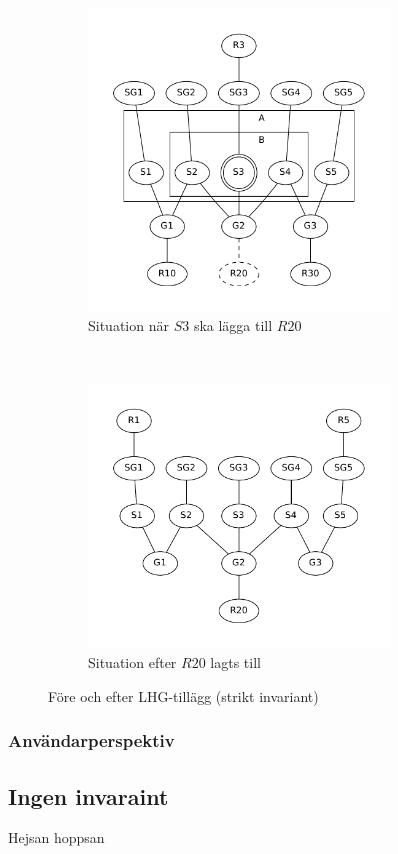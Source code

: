 
\begin{figure}
  \centering
  \begin{subfigure}[b]{0.5\textwidth}
    \centering
    \includegraphics[width=8.0cm]{fig/labgroup/strict_proof.pdf}
    \caption{Situation när $S3$ ska lägga till $R20$}
    \label{fig:strict-proof}
  \end{subfigure}%
        ~ %
  \begin{subfigure}[b]{0.5\textwidth}
    \centering
    \includegraphics[width=8.0cm]{fig/labgroup/strict_proof_continue.pdf}
    \caption{Situation efter $R20$ lagts till}
    \label{fig:strict-proof-continue}
  \end{subfigure}
  \caption{Före och efter LHG-tillägg (strikt invariant)}\label{fig:animals}
\end{figure}

\subsubsection{Användarperspektiv}
\subsection{Ingen invaraint}
Hejsan hoppsan
